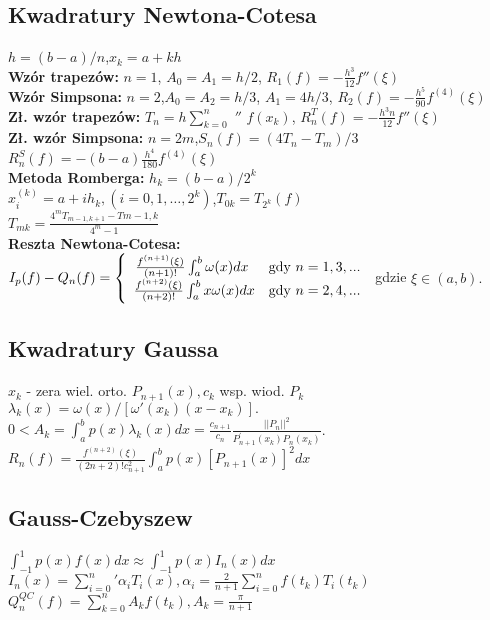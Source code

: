 \documentclass[a4paper,twocolumn]{article}
\begin{document}
\subsection{Kwadratury Newtona-Cotesa}
$h=(b-a)/n$,\quad $x_k=a+kh$\\
\textbf{Wzór trapezów:}  $n=1$, $A_0=A_1=h/2$, $R_1(f)=-\frac{h^3}{12}f''(\xi)$\\
\textbf{Wzór Simpsona:} $n=2$,$A_0=A_2=h/3$, $A_1=4h/3$, $R_2(f)=-\frac{h^5}{90}f^{(4)}(\xi)$\\
\textbf{Zł. wzór trapezów:} $T_n=h\sum_{k=0}^{n}$ $''$ $f(x_k)$,
$R_n^T(f)=-\frac{h^3n}{12}f''(\xi)$\\
\textbf{Zł. wzór Simpsona:} $n=2m$,\quad $S_n(f)=(4T_n-T_m)/3$\\
$R_n^S(f)=-(b-a)\frac{h^4}{180}f^{(4)}(\xi)$\\
\textbf{Metoda Romberga:} $h_k=(b-a)/2^k$\\
$x_i^(k)=a+ih_k,(i=0,1,\dots,2^k)$,\quad $T_{0k}=T_{2^k}(f)$\\
$T_{mk}=\frac{4^mT_{m-1,k+1} - T{m-1,k}}{4^m-1}$\\
\textbf{Reszta Newtona-Cotesa:} \\
\noindent$  I_p(f) - Q_n(f) = \left\{ \begin{array}{ll}
\left.\frac{f^{(n+1)}(\xi)}{(n+1)!}\int_{a}^{b} \omega(x) dx
\right. & \textrm{gdy $ n = 1,3,... $}\\
\frac{f^{(n+2)}(\xi)}{(n+2)!}\int_{a}^{b} x\omega(x) dx & \textrm{gdy $ n = 2,4,... $}
\end{array} \right.
$
gdzie $\xi \in (a, b).$
\subsection{Kwadratury Gaussa}
\noindent$x_k$ - zera wiel. orto. $P_{n+1}(x), c_k $ wsp. wiod. $P_k$\\
$\lambda_k(x) = \omega(x) / [\omega'(x_k)(x-x_k)]. $ \\
$0 < A_k=\int_{a}^{b}p(x)\lambda_k(x) dx = \frac{c_{n+1}}{c_n} \frac{||P_n||^2}{P_{n+1}^{'}(x_k)P_n(x_k)}$.  \\
$R_n(f)=\frac{f^{(n+2)}(\xi)}{(2n+2)!c_{n+1}^{2} }\int_a^bp(x)[P_{n+1}(x)]^2 dx $
\subsection{Gauss-Czebyszew}
\noindent
$\int_{-1}^1p(x)f(x)dx \approx \int_{-1}^1p(x)I_n(x)dx$ \\
$ I_n(x)=\sum_{i=0}^{n}  \prime \alpha_iT_i(x), \alpha_i=\frac{2}{n+1}\sum_{i=0}^nf(t_k)T_i(t_k)$\\
$Q_n^{QC}(f)=\sum_{k=0}^{n}A_kf(t_k), A_k=\frac{\pi}{n+1}$
\end{document}
